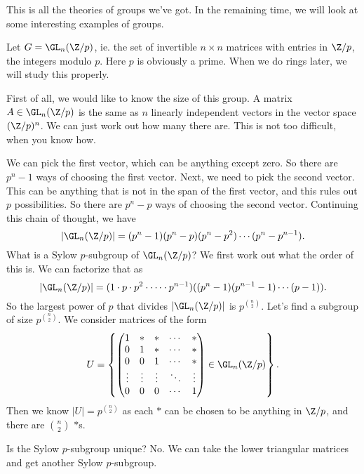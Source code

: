 \documentclass[a4paper]{article}
\begin{document}
This is all the theories of groups we've got. In the remaining time, we will look at some interesting examples of groups.
\begin{eg}
  Let $G = \GL_n(\Z/p)$, ie. the set of invertible $n\times n$ matrices with entries in $\Z/p$, the integers modulo $p$. Here $p$ is obviously a prime. When we do rings later, we will study this properly.

  First of all, we would like to know the size of this group. A matrix $A \in \GL_n(\Z/p)$ is the same as $n$ linearly independent vectors in the vector space $(\Z/p)^n$. We can just work out how many there are. This is not too difficult, when you know how.

  We can pick the first vector, which can be anything except zero. So there are $p^n - 1$ ways of choosing the first vector. Next, we need to pick the second vector. This can be anything that is not in the span of the first vector, and this rules out $p$ possibilities. So there are $p^n - p$ ways of choosing the second vector. Continuing this chain of thought, we have
  \[
    |\GL_n(\Z/p)| = (p^n - 1)(p^n - p)(p^n - p^2) \cdots (p^n - p^{n - 1}).
  \]
  What is a Sylow $p$-subgroup of $\GL_n(\Z/p)$? We first work out what the order of this is. We can factorize that as
  \[
    |\GL_n(\Z/p)|= (1 \cdot p \cdot p^2 \cdot \cdots \cdot p^{n - 1}) ((p^n - 1)(p^{n - 1} - 1) \cdots (p - 1)).
  \]
  So the largest power of $p$ that divides $|\GL_n(\Z/p)|$ is $p^{\binom{n}{2}}$. Let's find a subgroup of size $p^{\binom{n}{2}}$. We consider matrices of the form
  \[
    U = \left\{
      \begin{pmatrix}
        1 & * & * & \cdots & *\\
        0 & 1 & * & \cdots & *\\
        0 & 0 & 1 & \cdots & *\\
        \vdots & \vdots & \vdots & \ddots & \vdots\\
        0 & 0 & 0 & \cdots & 1
      \end{pmatrix} \in \GL_n(\Z/p)
    \right\}.
  \]
  Then we know $|U| = p^{\binom{n}{2}}$ as each $*$ can be chosen to be anything in $\Z/p$, and there are $\binom{n}{2}$ $*$s.

  Is the Sylow $p$-subgroup unique? No. We can take the lower triangular matrices and get another Sylow $p$-subgroup.
\end{eg}
\end{document}
